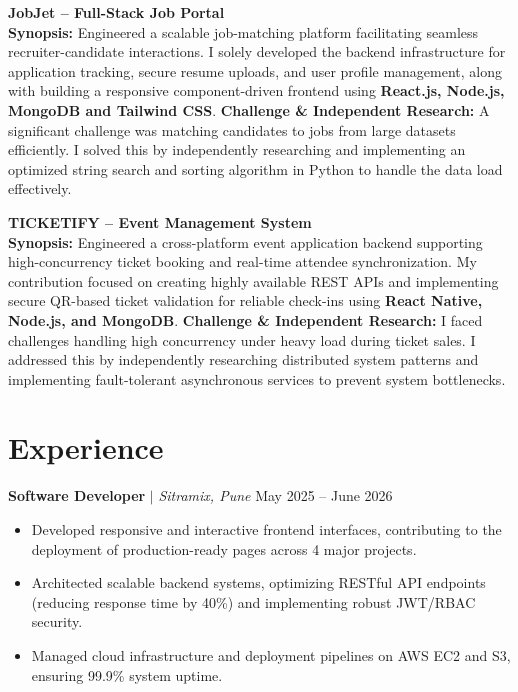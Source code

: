 \documentclass[a4paper,10pt]{article}
\begin{document}
\vspace{6pt}

\textbf{JobJet -- Full-Stack Job Portal}\\
\textbf{Synopsis:} Engineered a scalable job-matching platform facilitating seamless recruiter-candidate interactions. I solely developed the backend infrastructure for application tracking, secure resume uploads, and user profile management, along with building a responsive component-driven frontend using \textbf{React.js, Node.js, MongoDB and Tailwind CSS}. \textbf{Challenge \& Independent Research:} A significant challenge was matching candidates to jobs from large datasets efficiently. I solved this by independently researching and implementing an optimized string search and sorting algorithm in Python to handle the data load effectively.

\vspace{6pt}

\textbf{TICKETIFY -- Event Management System}\\
\textbf{Synopsis:} Engineered a cross-platform event application backend supporting high-concurrency ticket booking and real-time attendee synchronization. My contribution focused on creating highly available REST APIs and implementing secure QR-based ticket validation for reliable check-ins using \textbf{React Native, Node.js, and MongoDB}. \textbf{Challenge \& Independent Research:} I faced challenges handling high concurrency under heavy load during ticket sales. I addressed this by independently researching distributed system patterns and implementing fault-tolerant asynchronous services to prevent system bottlenecks.

\section*{Experience}
\textbf{Software Developer} $|$ \textit{Sitramix, Pune} \hfill May 2025 -- June 2026\\
\vspace{-6pt}
\begin{itemize}[leftmargin=*]
    \item Developed responsive and interactive frontend interfaces, contributing to the deployment of production-ready pages across 4 major projects.
    \item Architected scalable backend systems, optimizing RESTful API endpoints (reducing response time by 40\%) and implementing robust JWT/RBAC security.
    \item Managed cloud infrastructure and deployment pipelines on AWS EC2 and S3, ensuring 99.9\% system uptime.
\end{itemize}
\end{document}
